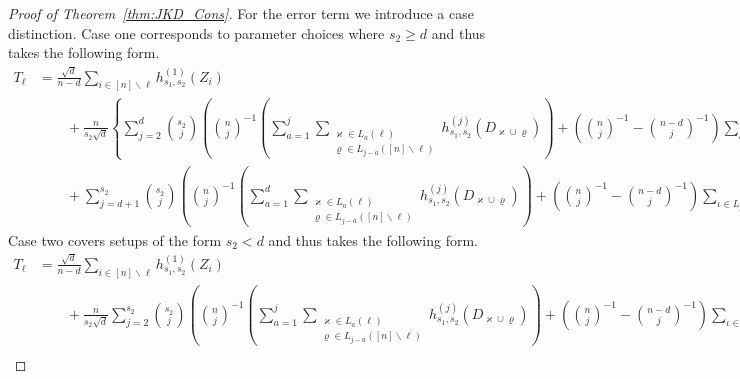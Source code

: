\begin{proof}[Proof of Theorem~\ref{thm:JKD_Cons}]
	\newpage
	For the error term we introduce a case distinction.
	Case one corresponds to parameter choices where $s_2 \geq d$ and thus takes the following form.
	\begin{equation}
		\begin{aligned}
			T_{\ell}
			 & = \frac{\sqrt{d}}{n - d}\sum_{i \in [n] \backslash \ell} h^{(1)}_{s_1, s_2}(Z_{i})                      \\
			 & \quad \quad + \frac{n}{s_2\sqrt{d}} \left\{\sum_{j = 2}^{d}\binom{s_2}{j}\left(\binom{n}{j}^{-1}\left(
			\sum_{a = 1}^{j}\sum_{\substack{\varkappa \in L_{a}\left(\ell\right)                                       \\ \varrho \in L_{j - a}\left([n]\backslash \ell\right)}} h^{(j)}_{s_1, s_2}(D_{\varkappa \cup \varrho})\right)
			+ \left(\binom{n}{j}^{-1} - \binom{n-d}{j}^{-1}\right)
			\sum_{\iota \in L_{j}\left([n]\backslash \ell\right)} h^{(j)}_{s_1, s_2}(\mathbf{D}_{\iota})\right)\right. \\
			 & \quad \quad +\left.  \sum_{j = d + 1}^{s_2}\binom{s_2}{j}
			\left( \binom{n}{j}^{-1}\left(
			\sum_{a = 1}^{d}\sum_{\substack{\varkappa \in L_{a}\left(\ell\right)                                       \\ \varrho \in L_{j - a}\left([n]\backslash \ell\right)}} h^{(j)}_{s_1, s_2}(D_{\varkappa \cup \varrho})\right)
			+ \left(\binom{n}{j}^{-1} - \binom{n-d}{j}^{-1}\right)\sum_{\iota \in L_{j}\left([n]\backslash \ell\right)} h^{(j)}_{s_1, s_2}(\mathbf{D}_{\iota})\right)
			\right\}
		\end{aligned}
	\end{equation}
	Case two covers setups of the form $s_2 < d$ and thus takes the following form.
	\begin{equation}
		\begin{aligned}
			T_{\ell}
			 & = \frac{\sqrt{d}}{n - d}\sum_{i \in [n] \backslash \ell} h^{(1)}_{s_1, s_2}(Z_{i})                  \\
			 & \quad \quad + \frac{n}{s_2 \sqrt{d}}  \sum_{j = 2}^{s_2}\binom{s_2}{j}\left(\binom{n}{j}^{-1}\left(
			\sum_{a = 1}^{j}\sum_{\substack{\varkappa \in L_{a}\left(\ell\right)                                   \\ \varrho \in L_{j - a}\left([n]\backslash \ell\right)}} h^{(j)}_{s_1, s_2}(D_{\varkappa \cup \varrho})\right)
			+ \left(\binom{n}{j}^{-1} - \binom{n-d}{j}^{-1}\right)
			\sum_{\iota \in L_{j}\left([n]\backslash \ell\right)} h^{(j)}_{s_1, s_2}(\mathbf{D}_{\iota})\right)    \\
		\end{aligned}
	\end{equation}


\end{proof}
